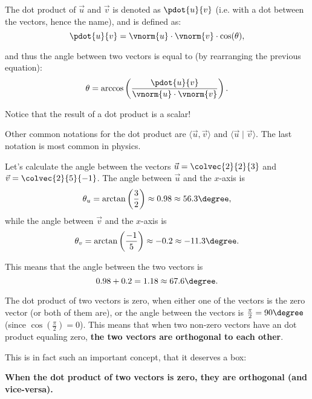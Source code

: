 The dot product of $\vec{u}$ and $\vec{v}$ is denoted as $\pdot{u}{v}$ (i.e. with a dot between the vectors, hence the name), and is defined as:
\begin{equation*}
  \pdot{u}{v} = \vnorm{u}\cdot\vnorm{v}\cdot\cos(\theta),
\end{equation*}

and thus the angle between two vectors is equal to (by rearranging the previous equation):
\begin{equation*}
  \theta = \arccos\left(\frac{\pdot{u}{v}}{\vnorm{u}\cdot\vnorm{v}}\right).
\end{equation*}
\begin{warning}
  Notice that the result of a dot product is a scalar!
\end{warning}

Other common notations for the dot product are $\langle \vec{u}, \vec{v} \rangle$ and $\langle \vec{u} \mid \vec{v} \rangle$. The last notation is most common in physics.

\begin{example}
  Let's calculate the angle between the vectors $\vec{u}=\colvec{2}{2}{3}$ and $\vec{v}=\colvec{2}{5}{-1}$.
  The angle between $\vec{u}$ and the $x$-axis is
  \begin{equation*}
  \theta_{u} = \arctan\left( \frac{3}{2} \right) \approx 0.98 \approx 56.3\degree,
  \end{equation*}
  while the angle between $\vec{v}$ and the $x$-axis is
  \begin{equation*}
  \theta_{v} = \arctan\left( \frac{-1}{5} \right) \approx -0.2 \approx -11.3\degree.
  \end{equation*}

  This means that the angle between the two vectors is
  \begin{equation*}
  0.98 + 0.2 = 1.18 \approx 67.6\degree.
  \end{equation*}
\end{example}

The dot product of two vectors is zero, when either one of the vectors is the zero vector (or both of them are), or the angle between the vectors is $\frac{\pi}{2}=90\degree$ (since $\cos\left( \frac{\pi}{2} \right)=0$). This means that when two non-zero vectors have an dot product equaling zero, \textbf{the two vectors are orthogonal to each other}.

This is in fact such an important concept, that it deserves a box:

\begin{important}
  
  \textbf{When the dot product of two vectors is zero, they are orthogonal (and vice-versa).}
\end{important}

